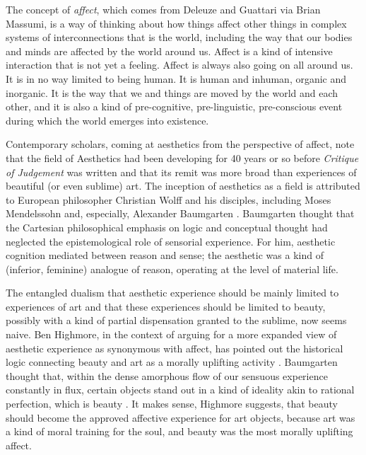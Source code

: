 \documentclass[letterpaper]{article}
\begin{document}
    The concept of \emph{affect}, which comes from Deleuze and Guattari via Brian Massumi, is a way of thinking about how things affect other things in complex systems of interconnections that is the world, including the way that our bodies and minds are affected by the world around us. Affect is a kind of intensive interaction that is not yet a feeling. Affect is always also going on all around us. It is in no way limited to being human. It is human and inhuman, organic and inorganic. It is the way that we and things are moved by the world and each other, and it is also a kind of pre-cognitive, pre-linguistic, pre-conscious event during which the world emerges into existence. 
        
    Contemporary scholars, coming at aesthetics from the perspective of affect, note that the field of Aesthetics had been developing for 40 years or so before \emph{Critique of Judgement} was written and that its remit was more broad than experiences of beautiful (or even sublime) art. The inception of aesthetics as a field is attributed to European philosopher Christian Wolff and his disciples, including Moses Mendelssohn and, especially, Alexander Baumgarten \citep[pp.327-338]{EagletonFrPrtclrs1990}. Baumgarten thought that the Cartesian philosophical emphasis on logic and conceptual thought had neglected the epistemological role of sensorial experience. For him, aesthetic cognition mediated between reason and sense; the aesthetic was a kind of (inferior, feminine) analogue of reason, operating at the level of material life. 
        
    The entangled dualism that aesthetic experience should be mainly limited to experiences of art and that these experiences should be limited to beauty, possibly with a kind of partial dispensation granted to the sublime, now seems naive. Ben Highmore, in the context of arguing for a more expanded view of aesthetic experience as synonymous with affect, has pointed out the historical logic connecting beauty and art as a morally uplifting activity \citep[p.121-122]{HighmoreBttrAftrTst2010}. Baumgarten thought that, within the dense amorphous flow of our sensuous experience constantly in flux, certain objects stand out in a kind of ideality akin to rational perfection, which is beauty \citep[p.328]{EagletonFrPrtclrs1990}. It makes sense, Highmore suggests, that beauty should become the approved affective experience for art objects, because art was a kind of moral training for the soul, and beauty was the most morally uplifting affect.
        
\end{document}
